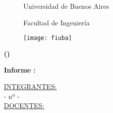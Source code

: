 

\begin{titlepage}
\centering
\begin{figure}[t]
	\centering
	{\huge  Universidad de Buenos Aires \par}
	{\huge Facultad de Ingeniería \par}
	\vspace{0.5cm}
	\texttt{[image: fiuba]}
    \vspace{1cm}
\end{figure}
	\vspace{1cm}
	{\huge \bfseries \nombreMateria \LARGE (\codigoMateria) \par}
	\vspace{1cm}
    {\textbf{\LARGE Informe \numeroInforme: \nombreInforme}\par}
    \vspace{2cm}
    {\underline{\Large INTEGRANTES:}\\}
    \vspace{0.5cm}
	{\nombreDos - nº \padronDos- \emph{\mailDos}\\ }
    \vspace{1cm}
    {\underline{\Large  DOCENTES:}\\}
    \vspace{0.5cm}
	{\Large\itshape  \docentes \par}
    \vspace{1cm}
    {\large \fecha \par}
	\vfill
\end{titlepage}

\pagestyle{fancy}
\fancyhead[C]{\rule{.5\textwidth}{4\baselineskip}}
\setlength{\headheight}{52pt}
\renewcommand{\sectionmark}[1]{\markboth{}{\thesection\ \ #1}}
\chead{}
\rhead{\codigoMateria - \nombreMateria}
\lfoot{}
\cfoot{\thepage}
\rfoot{}
